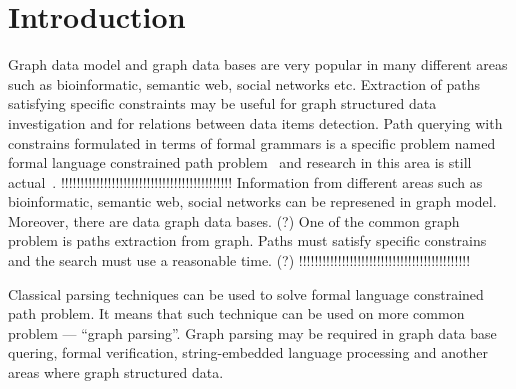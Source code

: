 \documentclass{sig-alternate} %
\begin{document}
\section{Introduction}
Graph data model and graph data bases are very popular in many different areas such as bioinformatic, semantic web, social networks etc.
Extraction of paths satisfying specific constraints may be useful for graph structured data investigation and for relations between data items detection.
Path querying with constrains formulated in terms of formal grammars is a specific problem named formal language constrained path problem~\cite{FLCpathProblem} and research in this area is still actual~\cite{DirOfBigGraphAnalysis}.
!!!!!!!!!!!!!!!!!!!!!!!!!!!!!!!!!!!!!!!!!!!!
Information from different areas such as bioinformatic, semantic web, social networks can be represened in graph model. Moreover, there are data graph data bases. (?) One of the common graph problem is paths extraction from graph. Paths must satisfy specific constrains and the search must use a reasonable time. (?)     
!!!!!!!!!!!!!!!!!!!!!!!!!!!!!!!!!!!!!!!!!!!!

Classical parsing techniques can be used to solve formal language constrained path problem. 
It means that such technique can be used on more common problem --- ``graph parsing''. 
Graph parsing may be required in graph data base quering, formal verification, string-embedded language processing and another areas where graph structured data. 
\end{document}
